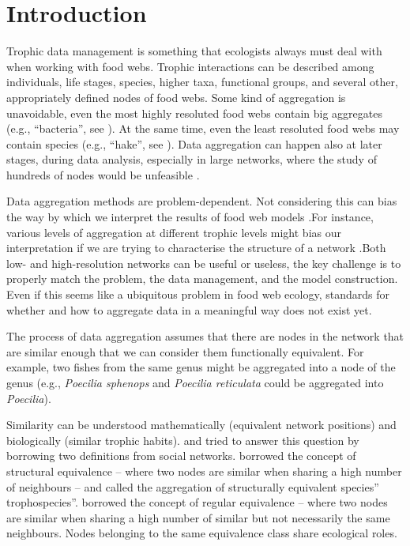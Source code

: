 \section*{Introduction}

	Trophic data management is something that ecologists always must deal with when working with food webs. Trophic interactions can be described among individuals, life stages, species, higher taxa, functional groups, and several other, appropriately defined nodes of food webs. Some kind of aggregation is unavoidable, even the most highly resoluted food webs contain big aggregates (e.g., “bacteria'', see \citet{Martinez1991}). At the same time, even the least resoluted food webs may contain species (e.g., “hake”, see \citet{Yodzis1998}). Data aggregation can happen also at later stages, during data analysis, especially in large networks, where the study of hundreds of nodes would be unfeasible \citep{Yodzis1999}.

	Data aggregation methods are problem-dependent. Not considering this can bias the way by which we interpret the results of food web models \citep{Paine1988, Hall1993}.For instance, various levels of aggregation at different trophic levels might bias our interpretation if we are trying to characterise the structure of a network \citep{Yodzis1999}.Both low- and high-resolution networks can be useful or useless, the key challenge is to properly match the problem, the data management, and the model construction. Even if this seems like a ubiquitous problem in food web ecology, standards for whether and how to aggregate data in a meaningful way does not exist yet.

	The process of data aggregation assumes that there are nodes in the network that are similar enough that we can consider them functionally equivalent.
	For example, two fishes from the same genus might be aggregated into a node of the genus (e.g., \emph{Poecilia sphenops} and \emph{Poecilia reticulata} could be aggregated into \emph{Poecilia}).

	Similarity can be understood mathematically (equivalent network positions) and biologically (similar trophic habits).	\citet{Yodzis1999} and \citet{Luczkovich2003} tried to answer this question by borrowing two definitions from social networks. \citet{Yodzis1999} borrowed the concept of structural equivalence – where two nodes are similar when sharing a high number of neighbours – and called the aggregation of structurally equivalent species” trophospecies”.
	\citet{Luczkovich2003} borrowed the concept of regular equivalence – where two nodes are similar when sharing a high number of similar but not necessarily the same neighbours. Nodes belonging to the same equivalence class share ecological roles.

